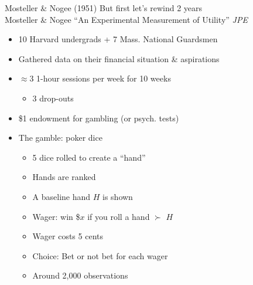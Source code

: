\begin{frame}{Mosteller \& Nogee (1951)}
    But first let's rewind 2 years\\
    Mosteller \& Nogee ``An Experimental Measurement of Utility'' \textit{JPE} 
    \begin{itemize}
        \item 10 Harvard undergrads + 7 Mass. National Guardsmen
        \item Gathered data on their financial situation \& aspirations
        \item $\approx$3 1-hour sessions per week for 10 weeks
        \begin{itemize}
            \item 3 drop-outs
        \end{itemize}
        \item \$1 endowment for gambling (or psych. tests)
        \item The gamble: poker dice
        \begin{itemize}
            \item 5 dice rolled to create a ``hand''
            \item Hands are ranked
            \item A baseline hand $H$ is shown
            \item Wager: win \$$x$ if you roll a hand $\succ$ $H$
            \item Wager costs 5 cents
            \item Choice: Bet or not bet for each wager
            \item Around 2,000 observations
        \end{itemize}
    \end{itemize}
\end{frame}

